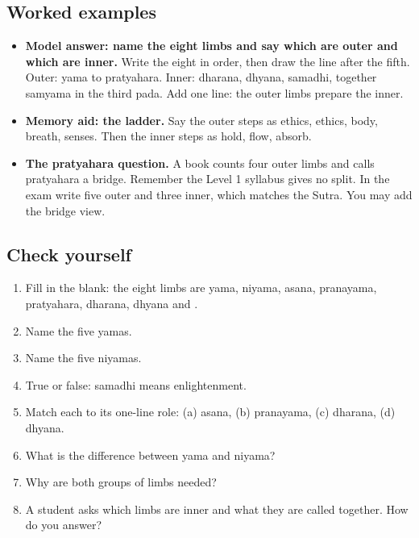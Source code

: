 \subsection*{Worked examples}
\begin{itemize}
\item \textbf{Model answer: name the eight limbs and say which are outer and which are inner.} Write the eight in order, then draw the line after the fifth. Outer: yama to pratyahara. Inner: dharana, dhyana, samadhi, together samyama in the third pada. Add one line: the outer limbs prepare the inner.
\item \textbf{Memory aid: the ladder.} Say the outer steps as ethics, ethics, body, breath, senses. Then the inner steps as hold, flow, absorb.
\item \textbf{The pratyahara question.} A book counts four outer limbs and calls pratyahara a bridge. Remember the Level 1 syllabus gives no split. In the exam write five outer and three inner, which matches the Sutra. You may add the bridge view.
\end{itemize}

\subsection*{Check yourself}
\begin{enumerate}
\item Fill in the blank: the eight limbs are yama, niyama, asana, pranayama, pratyahara, dharana, dhyana and \underline{\hspace{2cm}}.
\item Name the five yamas.
\item Name the five niyamas.
\item True or false: samadhi means enlightenment.
\item Match each to its one-line role: (a) asana, (b) pranayama, (c) dharana, (d) dhyana.
\item What is the difference between yama and niyama?
\item Why are both groups of limbs needed?
\item A student asks which limbs are inner and what they are called together. How do you answer?
\end{enumerate}

